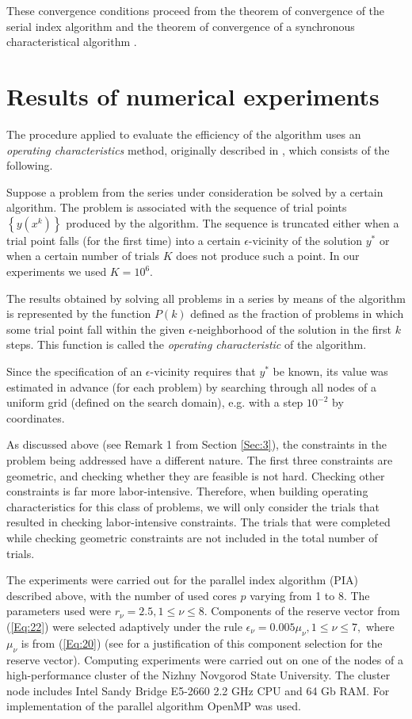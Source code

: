 \documentclass{llncs}
\begin{document}
These convergence conditions proceed from the theorem of convergence of the serial index algorithm \cite{Strongin2000} and the theorem of convergence of a synchronous characteristical algorithm  \cite{Grishagin1997}.

\section{Results of numerical experiments}

The procedure applied to evaluate the efficiency of the algorithm uses an \textit{operating characteristics} method, originally  described in \cite{Grishagin1978}, which consists of the following.

Suppose a problem from the series under consideration be solved by a certain algorithm. The problem is associated with the sequence of trial points $\left\{y(x^k)\right\}$ produced by the algorithm. The sequence is truncated either when a trial point falls (for the first time) into a certain $\epsilon$-vicinity of the solution $y^*$ or when a certain number of trials $K$ does not produce such a point. In our experiments we used $K=10^6$.

The results obtained by solving all problems in a series by means of the algorithm is represented by the function $P(k)$ defined as the fraction of problems in which some trial point fall within the given  $\epsilon$-neighborhood of the solution in the first $k$ steps. This function is called the \textit{operating characteristic} of the algorithm.

Since the specification of an $\epsilon$-vicinity requires that $y^*$ be known, its value was estimated in advance (for each problem) by searching through all nodes of a uniform grid (defined on the search domain), e.g. with a step $10^{-2}$ by coordinates.

As discussed above (see Remark 1 from Section \ref{Sec:3}), the constraints in the problem being addressed have a different nature. The first three constraints are geometric, and checking whether they are feasible is not hard. Checking other constraints is far more labor-intensive. Therefore, when building operating characteristics for this class of problems, we will only consider the trials that resulted in checking labor-intensive constraints. The trials that were completed while checking geometric constraints are not included in the total number of trials.

The experiments were carried out for the parallel index algorithm (PIA) described above, with the number of used cores $p$ varying from 1 to 8. The parameters used were $r_\nu=2.5, 1\leq\nu\leq 8$. Components of the reserve vector from (\ref{Eq:22})  were selected adaptively under the rule $\epsilon_\nu=0.005\mu_\nu, 1\leq\nu\leq 7,$ where $\mu_\nu$ is from (\ref{Eq:20}) (see \cite{Strongin2000} for a justification of this component selection for the reserve vector). Computing experiments were carried out on one of the nodes of a high-performance cluster of the Nizhny Novgorod State University. The cluster node includes Intel Sandy Bridge E5-2660 2.2 GHz CPU and 64 Gb RAM. For implementation of the parallel algorithm OpenMP was used.
\end{document}
